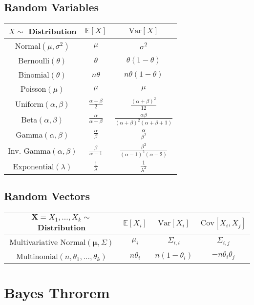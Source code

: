 \documentclass[12pt]{article}
\theoremstyle{definition}
\newcommand{\Expect}[1]{\mathbb{E}\left[#1\right]}
\newcommand{\Var}[1]{\text{Var}\left[#1\right]}
\newcommand{\Cov}[1]{\text{Cov}\left[#1\right]}
\begin{document}
    \subsection*{Random Variables}
    \begin{tabular}{|c|c|c|}
        \hline
        $X \sim$ Distribution & $\Expect{X}$ & $\Var{X}$\\
        \hline
        Normal$(\mu, \sigma^2)$ & $\mu$ & $\sigma^2$\\
        \hline
        Bernoulli$(\theta)$ & $\theta$ & $\theta(1-\theta)$\\
        \hline
        Binomial$(\theta)$ & $n\theta$ & $n\theta(1-\theta)$\\
        \hline
        Poisson$(\mu)$ & $\mu$ & $\mu$\\
        \hline
        Uniform$(\alpha, \beta)$ & $\frac{\alpha + \beta}{2}$ & $\frac{(\alpha + \beta)^2}{12}$\\
        \hline
        Beta$(\alpha, \beta)$ & $\frac{\alpha}{\alpha + \beta}$ & $\frac{\alpha\beta}{(\alpha + \beta)^2(\alpha + \beta+1)}$\\
        \hline
        Gamma$(\alpha, \beta)$ & $\frac{\alpha}{\beta}$ & $\frac{\alpha}{\beta^2}$\\
        \hline
        Inv. Gamma$(\alpha, \beta)$ & $\frac{\beta}{\alpha -1}$ & $\frac{\beta^2}{(\alpha-1)^2(\alpha -2)}$\\
        \hline
        Exponential$(\lambda)$ & $\frac{1}{\lambda}$ & $\frac{1}{\lambda^2}$\\
        \hline
    \end{tabular}
    \subsection*{Random Vectors}
    \begin{tabular}{|c|c|c|c|}
        \hline
        $\mathbf{X} = X_1,...,X_k \sim$ Distribution & $\Expect{X_i}$ & $\Var{X_i}$ & $\Cov{X_i,X_j}$\\
        \hline
        Multivariative Normal$(\bm{\mu}, \Sigma)$ & $\mu_i$ & $\Sigma_{i,i}$ & $\Sigma_{i,j}$\\
        \hline
        Multinomial$(n,\theta_1,...,\theta_k)$ & $n\theta_i$ & $n(1-\theta_i)$ & $-n\theta_i\theta_j$\\
        \hline
    \end{tabular}


\pagebreak
\section{Bayes Throrem}
\end{document}
